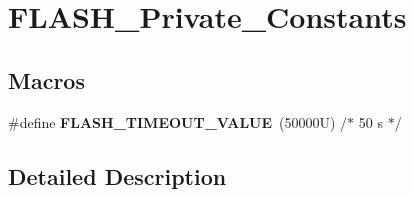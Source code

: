 \hypertarget{group___f_l_a_s_h___private___constants}{}\section{F\+L\+A\+S\+H\+\_\+\+Private\+\_\+\+Constants}
\label{group___f_l_a_s_h___private___constants}
\subsection*{Macros}
\begin{DoxyCompactItemize}
\item 
\mbox{\label{group___f_l_a_s_h___private___constants_ga76e8ea58ef37913dcdb61efae2d6ab8f}} 
\#define {\bfseries F\+L\+A\+S\+H\+\_\+\+T\+I\+M\+E\+O\+U\+T\+\_\+\+V\+A\+L\+UE}~(50000\+U) /$\ast$ 50 s $\ast$/
\end{DoxyCompactItemize}


\subsection{Detailed Description}
